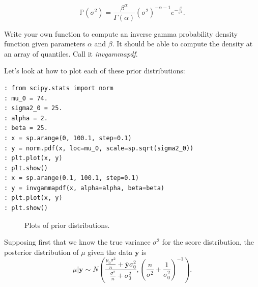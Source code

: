 $$\mathbb{P}(\sigma^{2}) = \frac{\beta^{\alpha}}{\Gamma(\alpha)}(\sigma^{2})^{-\alpha - 1}e^{-\frac{\beta}{\sigma^{2}}}.$$

\begin{problem}
Write your own function to compute an inverse gamma probability density function given parameters $\alpha$ and $\beta$. It should be able to compute the density at an array of quantiles. Call it \emph{invgammapdf}.
\end{problem}

Let's look at how to plot each of these prior distributions:

\begin{lstlisting}[style=python]
: from scipy.stats import norm
: mu_0 = 74.
: sigma2_0 = 25.
: alpha = 2.
: beta = 25.
: x = sp.arange(0, 100.1, step=0.1)
: y = norm.pdf(x, loc=mu_0, scale=sp.sqrt(sigma2_0))
: plt.plot(x, y)
: plt.show()
: x = sp.arange(0.1, 100.1, step=0.1)
: y = invgammapdf(x, alpha=alpha, beta=beta)
: plt.plot(x, y)
: plt.show()
\end{lstlisting}

\begin{figure}
\begin{center}
\label{figur}\caption{Plots of prior distributions.}
\end{center}
\end{figure}

Supposing first that we know the true variance $\sigma^{2}$ for the score distribution, the posterior distribution of $\mu$ given the data $\mathbf{y}$ is
$$\mu | \mathbf{y} \sim N\left(\frac{\frac{\mu_{0}\sigma^{2}}{n} + \overline{\mathbf{y}}\sigma_{0}^{2}}{\frac{\sigma^{2}}{n} + \sigma_{0}^{2}}, \left(\frac{n}{\sigma^{2}} + \frac{1}{\sigma_{0}^{2}}\right)^{-1}\right).$$

